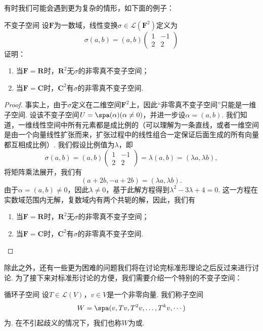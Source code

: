 有时我们可能会遇到更为复杂的情形，如下面的例子：
\begin{example}{}{不变子空间}
    设$\mathbf{F}$为一数域，线性变换$\sigma\in\mathcal{L}(\mathbf{F}^2)$定义为
    \[\sigma(a,b)=(a,b)\begin{pmatrix}
            1 & -1 \\ 2 & 2
        \end{pmatrix}\]
    证明：
    \begin{enumerate}
        \item 当$\mathbf{F}=\mathbf{R}$时，$\mathbf{R}^2$无$\sigma$的非零真不变子空间；

        \item 当$\mathbf{F}=\mathbf{C}$时，$\mathbf{C}^2$有$\sigma$的非零真不变子空间.
    \end{enumerate}
\end{example}

\begin{proof}
    事实上，由于$\sigma$定义在二维空间$\mathbf{F}^2$上，因此``非零真不变子空间''只能是一维子空间. 设该不变子空间$U=\spa(\alpha)(\alpha\neq 0)$，并进一步设$\alpha=(a,b)$. 我们知道，一维线性空间中所有元素都是成比例的（可以理解为一条直线，或者一维空间是由一个向量线性扩张而来，扩张过程中的线性组合一定保证后面生成的所有向量都互相成比例）. 我们假设比例值为$\lambda$，即
    \[\sigma(a,b)=(a,b)\begin{pmatrix}
            1 & -1 \\ 2 & 2
        \end{pmatrix}=\lambda(a,b)=(\lambda a,\lambda b),\]
    将矩阵乘法展开，我们有
    \[(a+2b,-a+2b)=(\lambda a,\lambda b).\]
    由于$\alpha=(a,b)\neq 0$，因此$\lambda\neq 0$，基于此解方程得到$\lambda^2-3\lambda+4=0$. 这一方程在实数域范围内无解，复数域内有两个共轭的解，因此，我们有
    \begin{enumerate}
        \item 当$\mathbf{F}=\mathbf{R}$时，$\mathbf{R}^2$无$\sigma$的非零真不变子空间；

        \item 当$\mathbf{F}=\mathbf{C}$时，$\mathbf{C}^2$有$\sigma$的非零真不变子空间.
    \end{enumerate}
\end{proof}

除此之外，还有一些更为困难的问题我们将在讨论完标准形理论之后反过来进行讨论. 为了接下来对标准形讨论的方便，我们需要介绍一个特别的不变子空间：
\begin{definition}{}{循环子空间}
    设$T\in\mathcal{L}(V)$，$v\in V$是一个非零向量. 我们称子空间
    \[W=\spa(v,Tv,T^2v,\ldots,T^kv,\cdots)\]
    为. 在不引起歧义的情况下，我们也称$W$为或.
\end{definition}

